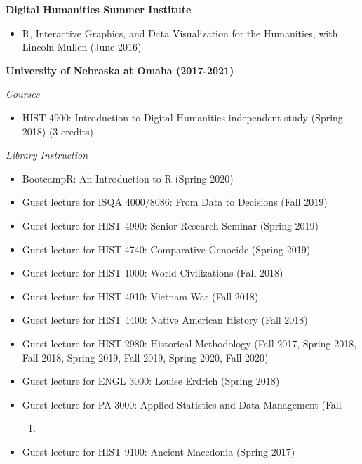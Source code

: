 \textbf{Digital Humanities Summer Institute}

\begin{itemize}
\tightlist
\item
  R, Interactive Graphics, and Data Visualization for the Humanities,
  with Lincoln Mullen (June 2016)
\end{itemize}

\textbf{University of Nebraska at Omaha (2017-2021)}

\emph{Courses}

\begin{itemize}
\tightlist
\item
  HIST 4900: Introduction to Digital Humanities independent study
  (Spring 2018) (3 credits)
\end{itemize}

\emph{Library Instruction}

\begin{itemize}
\tightlist
\item
  BootcampR: An Introduction to R (Spring 2020)
\item
  Guest lecture for ISQA 4000/8086: From Data to Decisions (Fall 2019)
\item
  Guest lecture for HIST 4990: Senior Research Seminar (Spring 2019)
\item
  Guest lecture for HIST 4740: Comparative Genocide (Spring 2019)
\item
  Guest lecture for HIST 1000: World Civilizations (Fall 2018)
\item
  Guest lecture for HIST 4910: Vietnam War (Fall 2018)
\item
  Guest lecture for HIST 4400: Native American History (Fall 2018)
\item
  Guest lecture for HIST 2980: Historical Methodology (Fall 2017, Spring
  2018, Fall 2018, Spring 2019, Fall 2019, Spring 2020, Fall 2020)
\item
  Guest lecture for ENGL 3000: Louise Erdrich (Spring 2018)
\item
  Guest lecture for PA 3000: Applied Statistics and Data Management
  (Fall

  \begin{enumerate}
  \def\labelenumi{\arabic{enumi})}
  \setcounter{enumi}{2016}
  \item
  \end{enumerate}
\item
  Guest lecture for HIST 9100: Ancient Macedonia (Spring 2017)
\end{itemize}

